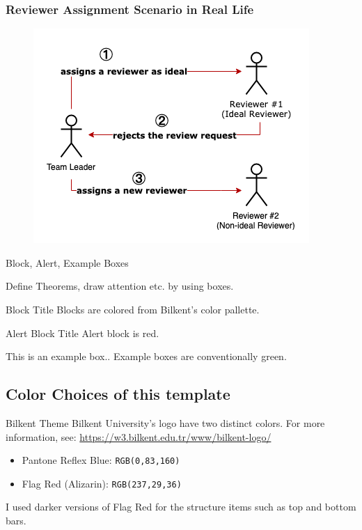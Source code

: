 \documentclass{beamer}
\begin{document}
\begin{frame}
\frametitle{\large Reviewer Assignment Scenario in Real Life}
  \begin{figure}
    \includegraphics[scale=0.6]{img/gt_3.png}
    \end{figure}

\end{frame}






\begin{frame}{Block, Alert, Example Boxes}

    Define Theorems, draw attention etc. by using boxes.
        
    \begin{block}{Block Title}
        Blocks are colored from Bilkent's color pallette.
    \end{block}
    
    \begin{alertblock}{Alert Block Title}
        Alert block is red.
    \end{alertblock}
    
    \begin{examples}
        This is an example box.. Example boxes are conventionally green.
    \end{examples}
\end{frame}

\subsection{Color Choices of this template}

\begin{frame}{Bilkent Theme}
    Bilkent University's logo have two distinct colors. For more information, see: \url{https://w3.bilkent.edu.tr/www/bilkent-logo/}
    
    \begin{itemize}
        \item Pantone Reflex Blue: \texttt{RGB(0,83,160)}
        \item Flag Red (Alizarin): \texttt{RGB(237,29,36)}
    \end{itemize}
    
    I used darker versions of Flag Red for the structure items such as top and bottom bars.
\end{frame}
\end{document}
